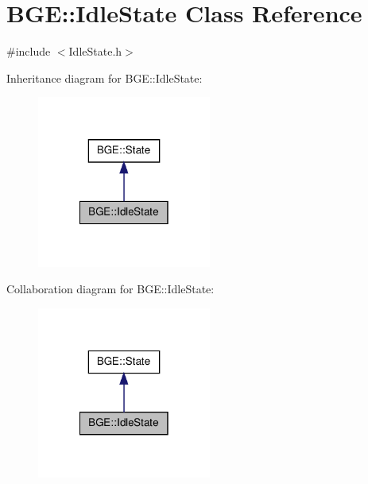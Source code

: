 \hypertarget{class_b_g_e_1_1_idle_state}{\section{B\-G\-E\-:\-:Idle\-State Class Reference}
\label{class_b_g_e_1_1_idle_state}
}


{\ttfamily \#include $<$Idle\-State.\-h$>$}



Inheritance diagram for B\-G\-E\-:\-:Idle\-State\-:
\nopagebreak
\begin{figure}[H]
\begin{center}
\leavevmode
\includegraphics[width=162pt]{class_b_g_e_1_1_idle_state__inherit__graph}
\end{center}
\end{figure}


Collaboration diagram for B\-G\-E\-:\-:Idle\-State\-:
\nopagebreak
\begin{figure}[H]
\begin{center}
\leavevmode
\includegraphics[width=162pt]{class_b_g_e_1_1_idle_state__coll__graph}
\end{center}
\end{figure}
